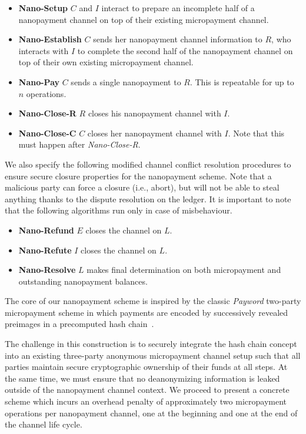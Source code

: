 \begin{itemize}
\item \textbf{Nano-Setup} $C$ and $I$ interact to prepare an incomplete half of
  a nanopayment channel on top of their existing micropayment channel.
\item \textbf{Nano-Establish} $C$ sends her nanopayment channel information to
  $R$, who interacts with $I$ to complete the second half of the nanopayment
  channel on top of their own existing micropayment channel.
\item \textbf{Nano-Pay} $C$ sends a single nanopayment to $R$. This is
  repeatable for up to $n$ operations.
\item \textbf{Nano-Close-R} $R$ closes his nanopayment channel with $I$.
\item \textbf{Nano-Close-C} $C$ closes her nanopayment channel with $I$. Note
  that this must happen after \emph{Nano-Close-R}.
\end{itemize}

We also specify the following modified channel conflict resolution procedures to
ensure secure closure properties for the nanopayment scheme. Note that a
malicious party can force a closure (i.e., abort), but will not be able to steal
anything thanks to the dispute resolution on the ledger. It is important to note
that the following algorithms run only in case of misbehaviour.

\begin{itemize}
\item \textbf{Nano-Refund} $E$ closes the channel on $L$.
\item \textbf{Nano-Refute} $I$ closes the channel on $L$.
\item \textbf{Nano-Resolve} $L$ makes final determination on both micropayment
  and outstanding nanopayment balances.
\end{itemize}

The core of our nanopayment scheme is inspired by the classic \emph{Payword}
two-party micropayment scheme in which payments are encoded by successively
revealed preimages in a precomputed hash chain~\cite{rivest1996payword}.

The challenge in this construction is to securely integrate the hash chain
concept into an existing three-party anonymous micropayment channel setup such
that all parties maintain secure cryptographic ownership of their funds at all
steps. At the same time, we must ensure that no deanonymizing information is
leaked outside of the nanopayment channel context. We proceed to present a
concrete scheme which incurs an overhead penalty of approximately two
micropayment operations per nanopayment channel, one at the beginning and one at
the end of the channel life cycle.

